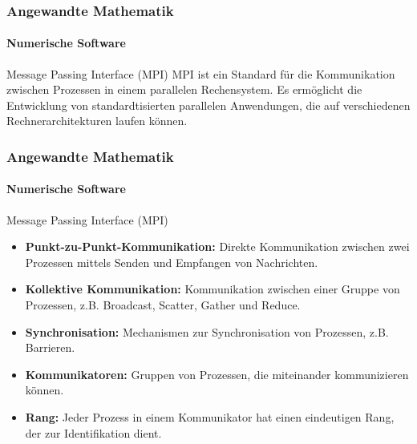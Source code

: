 \documentclass{beamer}
\begin{document}
 \begin{frame}
    \frametitle{Angewandte Mathematik}
    \framesubtitle{Numerische Software}
    \begin{block}{Message Passing Interface (MPI)}
          MPI ist ein Standard für die Kommunikation zwischen Prozessen in einem parallelen Rechensystem.
          Es ermöglicht die Entwicklung von standardtisierten parallelen Anwendungen, die auf verschiedenen Rechnerarchitekturen laufen können.
    \end{block}
\end{frame}



\begin{frame}
    \frametitle{Angewandte Mathematik}
    \framesubtitle{Numerische Software}
    \begin{block}{Message Passing Interface (MPI)}
            \begin{itemize}
                \item \textbf{Punkt-zu-Punkt-Kommunikation:} Direkte Kommunikation zwischen zwei Prozessen mittels Senden und Empfangen von Nachrichten.
                \item \textbf{Kollektive Kommunikation:} Kommunikation zwischen einer Gruppe von Prozessen, z.B. Broadcast, Scatter, Gather und Reduce.
                \item \textbf{Synchronisation:} Mechanismen zur Synchronisation von Prozessen, z.B. Barrieren.
                \item \textbf{Kommunikatoren:} Gruppen von Prozessen, die miteinander kommunizieren können.
                \item \textbf{Rang:} Jeder Prozess in einem Kommunikator hat einen eindeutigen Rang, der zur Identifikation dient.
            \end{itemize}
    \end{block}
\end{frame}
\end{document}
